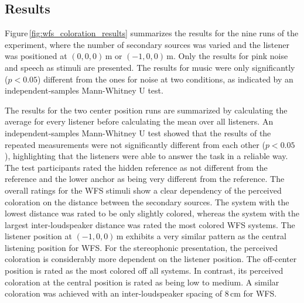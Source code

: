 \subsection{Results}
\label{sec:coloration_results}
%
Figure\,\ref{fig:wfs_coloration_results} summarizes the results for the nine
runs of the experiment, where the number of secondary sources was varied and the
listener was positioned at $(0,0,0)$\,m or $(-1,0,0)$\,m. Only the results for
pink noise and speech as stimuli are presented. The results for music
were only significantly ($p<0.05$)
different from the ones for
noise at two conditions, as indicated by an independent-samples Mann-Whitney U test.
%
\begin{figure*}[t]
    \small
    \centering
    
    \caption{Average results with confidence intervals for the perceived
    coloration. Dark colors show results for the central listening position,
    lighter colors for the off-center position.
    }
    \label{fig:wfs_coloration_results}
\end{figure*}
%
The results for the two center position runs are summarized by calculating the
average for every listener before calculating the mean over all listeners. An
independent-samples Mann-Whitney U test showed that the results of the repeated
measurements were not significantly different from each other ($p<0.05$), highlighting that
the listeners were able to answer the task in a reliable way.
The test participants rated the hidden reference as not different from the
reference and the lower anchor as being very different from the reference. The overall
ratings for the \ac{WFS} stimuli show a clear dependency of the perceived
coloration on the distance between the secondary sources. The system with the lowest
distance was rated to be only slightly colored, whereas the system with the
largest inter-loudspeaker distance was rated the most colored \ac{WFS} systems. The
listener position at $(-1,0,0)$\,m exhibits a very similar pattern as the
central listening position for \ac{WFS}.
For the stereophonic presentation, the perceived coloration is considerably
more dependent on
the listener position. The off-center position is rated as the most colored off
all systems. In contrast, its
perceived coloration at the central position is rated as being low to medium.
A similar coloration was achieved with an inter-loudspeaker spacing of $8$\,cm for
\ac{WFS}.

